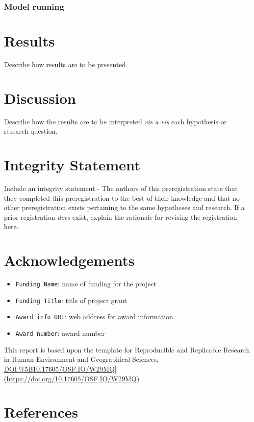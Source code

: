 \documentclass[
]{article}
\providecommand{\tightlist}{%
  \setlength{\itemsep}{0pt}\setlength{\parskip}{0pt}}
\begin{document}
\hypertarget{model-running}{%
\subsubsection{Model running}\label{model-running}}

\hypertarget{results}{%
\section{Results}\label{results}}

Describe how results are to be presented.

\hypertarget{discussion}{%
\section{Discussion}\label{discussion}}

Describe how the results are to be interpreted \emph{vis a vis} each
hypothesis or research question.

\hypertarget{integrity-statement}{%
\section{Integrity Statement}\label{integrity-statement}}

Include an integrity statement - The authors of this preregistration
state that they completed this preregistration to the best of their
knowledge and that no other preregistration exists pertaining to the
same hypotheses and research. If a prior registration \emph{does} exist,
explain the rationale for revising the registration here.

\hypertarget{acknowledgements}{%
\section{Acknowledgements}\label{acknowledgements}}

\begin{itemize}
\tightlist
\item
  \texttt{Funding\ Name}: name of funding for the project
\item
  \texttt{Funding\ Title}: title of project grant
\item
  \texttt{Award\ info\ URI}: web address for award information
\item
  \texttt{Award\ number}: award number
\end{itemize}

This report is based upon the template for Reproducible and Replicable
Research in Human-Environment and Geographical Sciences,
\url{DOI:\%5B10.17605/OSF.IO/W29MQ}{]}(\url{https://doi.org/10.17605/OSF.IO/W29MQ})

\hypertarget{references}{%
\section{References}\label{references}}
\end{document}
